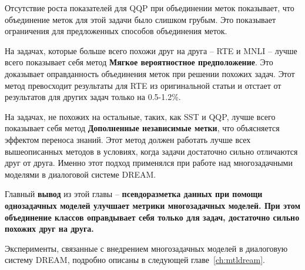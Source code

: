  Отсутствие роста показателей для QQP при объединении меток показывает, что объединение меток для этой задачи было слишком грубым. Это показывает ограничения для предложенных способов объединения меток.
 
На задачах, которые больше всего похожи друг на друга -- RTE и MNLI -- лучше всего показывает себя метод \textbf{Мягкое вероятностное предположение}. Это доказывает оправданность объединения меток при решении похожих задач. Этот метод превосходит результаты для RTE из оригинальной статьи и отстает от результатов для других задач только на 0.5-1.2\%.

На задачах, не похожих на остальные, таких, как SST и QQP, лучше всего показывает себя метод \textbf{Дополненные независимые метки}, что объясняется эффектом переноса знаний. Этот метод должен работать лучше всех вышеописанных методов в условиях, когда задачи достаточно сильно отличаются друг от друга. Именно этот подход применялся при работе над многозадачными моделями в диалоговой системе DREAM.

Главный \textbf{вывод} из этой главы -- \textbf{псевдоразметка данных при помощи однозадачных моделей улучшает метрики многозадачных моделей. При этом объединение классов оправдывает себя только для задач, достаточно сильно похожих друг на друга.}

Эксперименты, связанные с внедрением многозадачных моделей в диалоговую систему DREAM, подробно описаны в следующей главе~\ref{ch:mtldream}.
